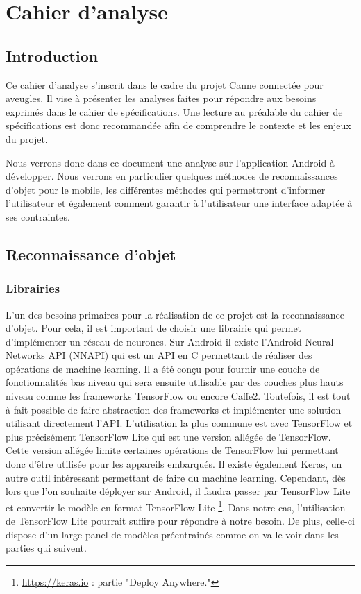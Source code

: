 \documentclass[UTF8]{EPURapport}
\begin{document}
\chapter{Cahier d'analyse}

\section{Introduction}
Ce cahier d'analyse s'inscrit dans le cadre du projet Canne connectée pour aveugles. Il vise à présenter les analyses faites pour répondre aux besoins exprimés dans le cahier de spécifications. Une lecture au préalable du cahier de spécifications est donc recommandée afin de comprendre le contexte et les enjeux du projet.

Nous verrons donc dans ce document une analyse sur l'application Android à développer. Nous verrons en particulier quelques méthodes de reconnaissances d'objet pour le mobile, les différentes méthodes qui permettront d'informer l'utilisateur et également comment garantir à l'utilisateur une interface adaptée à ses contraintes.

\section{Reconnaissance d'objet}
\subsection{Librairies}
L'un des besoins primaires pour la réalisation de ce projet est la reconnaissance d'objet. Pour cela, il est important de choisir une librairie qui permet d'implémenter un réseau de neurones. Sur Android il existe l'Android Neural Networks API (NNAPI) qui est un API en C permettant de réaliser des opérations de machine learning. Il a été conçu pour fournir une couche de fonctionnalités bas niveau qui sera ensuite utilisable par des couches plus hauts niveau comme les frameworks TensorFlow ou encore Caffe2. Toutefois, il est tout à fait possible de faire abstraction des frameworks et implémenter une solution utilisant directement l'API. L'utilisation la plus commune est avec TensorFlow et plus précisément TensorFlow Lite qui est une version allégée de TensorFlow. Cette version allégée limite certaines opérations de TensorFlow lui permettant donc d'être utilisée pour les appareils embarqués. Il existe également Keras, un autre outil intéressant permettant de faire du machine learning. Cependant, dès lors que l'on souhaite déployer sur Android, il faudra passer par TensorFlow Lite et convertir le modèle en format TensorFlow Lite \footnote{\url{https://keras.io} : partie "Deploy Anywhere."}. Dans notre cas, l'utilisation de TensorFlow Lite pourrait suffire pour répondre à notre besoin. De plus, celle-ci dispose d'un large panel de modèles préentrainés comme on va le voir dans les parties qui suivent.  
\end{document}
